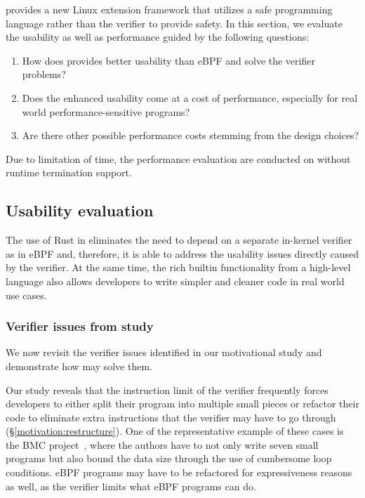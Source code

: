 \projname{} provides a new Linux extension framework that utilizes a safe
    programming language rather than the verifier to provide safety.
In this section, we evaluate the usability as well as performance guided by the
    following questions:
\begin{enumerate}
    \item How does \projname{} provides better usability than eBPF and solve the
        verifier problems?
    \item Does the enhanced usability come at a cost of performance, especially
        for real world performance-sensitive programs?
    \item Are there other possible performance costs stemming from the design
        choices?
\end{enumerate}

Due to limitation of time, the performance evaluation are conducted on
    \projname{} without runtime termination support.

\subsection{Usability evaluation}
The use of Rust in \projname{} eliminates the need to depend on a separate
    in-kernel verifier as in eBPF and, therefore, it is able to address the
    usability issues directly caused by the verifier.
At the same time, the rich builtin functionality from a high-level language
    also allows developers to write simpler and cleaner code in real world use
    cases.

\subsubsection{Verifier issues from study}
We now revisit the verifier issues identified in our motivational study and
    demonstrate how \projname{} may solve them.

Our study reveals that the instruction limit of the verifier frequently
    forces developers to either split their program into multiple small pieces
    or refactor their code to eliminate extra instructions that the verifier
    may have to go through (\S\ref{motivation:restructure}).
One of the representative example of these cases is the BMC project~\cite{BMC},
    where the authors have to not only write seven small programs but also
    bound the data size through the use of cumbersome loop conditions.
eBPF programs may have to be refactored for expressiveness reasons as well,
    as the verifier limits what eBPF programs can do.

